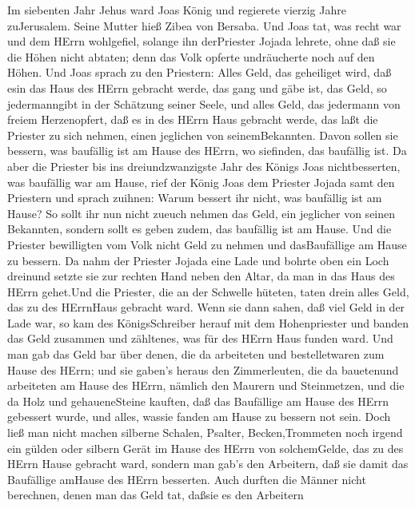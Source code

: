  Im siebenten Jahr Jehus ward Joas König und regierete
vierzig Jahre zuJerusalem. Seine Mutter hieß Zibea von Bersaba.
 Und Joas tat, was recht war und dem HErrn wohlgefiel,
solange ihn derPriester Jojada lehrete,  ohne daß sie die
Höhen nicht abtaten; denn das Volk opferte undräucherte noch auf den
Höhen.  Und Joas sprach zu den Priestern: Alles Geld, das
geheiliget wird, daß esin das Haus des HErrn gebracht werde, das gang
und gäbe ist, das Geld, so jedermanngibt in der Schätzung seiner Seele,
und alles Geld, das jedermann von freiem Herzenopfert, daß es in des
HErrn Haus gebracht werde,  das laßt die Priester zu sich
nehmen, einen jeglichen von seinemBekannten. Davon sollen sie bessern,
was baufällig ist am Hause des HErrn, wo siefinden, das baufällig ist.
 Da aber die Priester bis ins dreiundzwanzigste Jahr des
Königs Joas nichtbesserten, was baufällig war am Hause, 
rief der König Joas dem Priester Jojada samt den Priestern und sprach
zuihnen: Warum bessert ihr nicht, was baufällig ist am Hause? So sollt
ihr nun nicht zueuch nehmen das Geld, ein jeglicher von seinen
Bekannten, sondern sollt es geben zudem, das baufällig ist am Hause.
 Und die Priester bewilligten vom Volk nicht Geld zu nehmen
und dasBaufällige am Hause zu bessern.  Da nahm der Priester
Jojada eine Lade und bohrte oben ein Loch dreinund setzte sie zur
rechten Hand neben den Altar, da man in das Haus des HErrn gehet.Und die
Priester, die an der Schwelle hüteten, taten drein alles Geld, das zu
des HErrnHaus gebracht ward.  Wenn sie dann sahen, daß viel
Geld in der Lade war, so kam des KönigsSchreiber herauf mit dem
Hohenpriester und banden das Geld zusammen und zähltenes, was für des
HErrn Haus funden ward.  Und man gab das Geld bar über
denen, die da arbeiteten und bestelletwaren zum Hause des HErrn; und sie
gaben's heraus den Zimmerleuten, die da bauetenund arbeiteten am Hause
des HErrn,  nämlich den Maurern und Steinmetzen, und die da
Holz und gehaueneSteine kauften, daß das Baufällige am Hause des HErrn
gebessert wurde, und alles, wassie fanden am Hause zu bessern not sein.
 Doch ließ man nicht machen silberne Schalen, Psalter,
Becken,Trommeten noch irgend ein gülden oder silbern Gerät im Hause des
HErrn von solchemGelde, das zu des HErrn Hause gebracht ward,
 sondern man gab's den Arbeitern, daß sie damit das
Baufällige amHause des HErrn besserten.  Auch durften die
Männer nicht berechnen, denen man das Geld tat, daßsie es den Arbeitern
